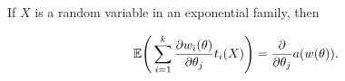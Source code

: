 \begin{theorem} If \(X\) is a random variable in an exponential family, then

%
\begin{equation}\label{prob.thm.3.4.2.casella}
\mathbb{E} \Bigg( \sum_{i=1}^k \frac{\partial w_i(\theta)}{\partial \theta_j} t_i(X) \Bigg) =  \frac{\partial }{\partial \theta_j}  a(w(\theta)).
\end{equation}


%
%

\end{theorem}



